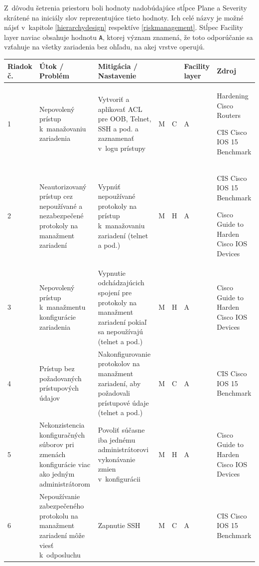 Z~dôvodu šetrenia priestoru boli hodnoty nadobúdajúce stĺpce Plane a Severity skrátené na iniciály slov reprezentujúce tieto hodnoty. Ich celé názvy je možné nájsť v~kapitole \ref{hierarchydesign} respektíve \ref{riskmanagement}. Stĺpec Facility layer naviac obsahuje hodnotu \texttt{A}, ktorej význam znamená, že toto odporúčanie sa vzťahuje na všetky zariadenia bez ohľadu, na akej vrstve operujú.  

\newpage


\footnotesize
{}
\begin{longtable}[!htbp]{|C{2.5em}L{9em}L{9em}C{2em}C{2.5em}C{7.5em}L{10em}|}
	
	\hline
	\centering
	
	Riadok č.	&Útok / Problém	&Mitigácia / Nastavenie	& 	&	&Facility layer	&Zdroj\\
	\endhead
	
	 1	&Nepovolený prístup k~manažovaniu zariadenia	&Vytvoriť a aplikovať ACL pre OOB, Telnet, SSH a pod. a zaznamenať v~logu prístupy	&M	&C	&A	&Hardening Cisco Routers \cite{Akin2002}
	
	CIS Cisco IOS 15 Benchmark \cite{CIS_DrTLsgXv24lxeIIM}	\\
	2	&Neautorizovaný prístup cez nepoužívané a nezabezpečené protokoly na manažment zariadení	&Vypnúť nepoužívané protokoly na prístup k~manažovaniu zariadení (telnet a pod.)	&M	&H	&A	&CIS Cisco IOS 15 Benchmark \cite{CIS_DrTLsgXv24lxeIIM}
	
	Cisco Guide to Harden Cisco IOS Devices \cite{Singh2018}
	\\
	 3	&Nepovolený prístup k~manažmentu konfigurácie zariadenia	&Vypnutie odchádzajúcich spojení pre protokoly na manažment zariadení pokiaľ sa nepoužívajú (telnet a pod.)	&M	&H	&A	&Cisco Guide to Harden Cisco IOS Devices \cite{Singh2018}	\\
	4	&Prístup bez požadovaných prístupových údajov	&Nakonfigurovanie protokolov na manažment zariadení, aby požadovali prístupové údaje (telnet a pod.)	&M	&C	&A	&CIS Cisco IOS 15 Benchmark \cite{CIS_DrTLsgXv24lxeIIM}	\\
	 5	&Nekonzistencia konfiguračných súborov pri zmenách konfigurácie viac ako jedným administrátorom	&Povoliť súčasne iba jednému administrátorovi vykonávanie zmien v~konfigurácii	&M	&H	&A	&Cisco Guide to Harden Cisco IOS Devices \cite{Singh2018}	\\
	6	&Nepoužívanie zabezpečeného protokolu na manažment zariadení môže viesť k~odposluchu	&Zapnutie SSH	&M	&C	&A	&CIS Cisco IOS 15 Benchmark \cite{CIS_DrTLsgXv24lxeIIM}
	

\end{longtable}
